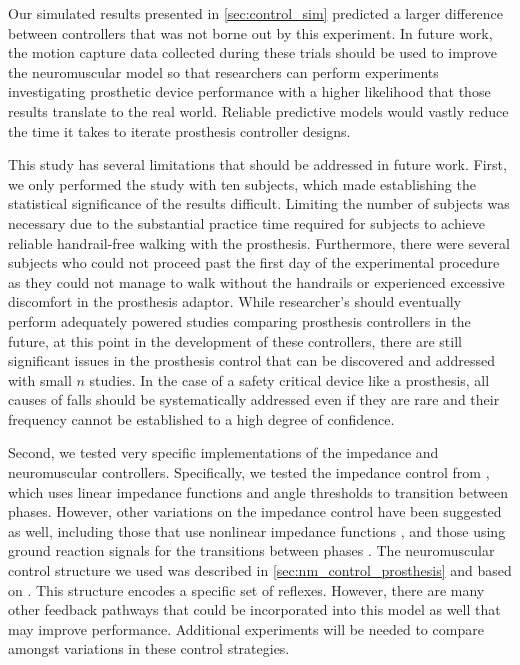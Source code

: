 Our simulated results presented in \cref{sec:control_sim} predicted a larger
difference between controllers that was not borne out by this experiment.  In
future work, the motion capture data collected during these trials should be
used to improve the neuromuscular model so that researchers can perform
experiments investigating prosthetic device performance with a higher likelihood
that those results translate to the real world. Reliable predictive models would
vastly reduce the time it takes to iterate prosthesis controller designs.

This study has several limitations that should be addressed in future work.
First, we only performed the study with ten subjects, which made establishing
the statistical significance of the results difficult. Limiting the number of
subjects was necessary due to the substantial practice time required for
subjects to achieve reliable handrail-free walking with the prosthesis.
Furthermore, there were several  subjects who could not proceed
past the first day of the experimental procedure as they could not manage to
walk without the handrails or experienced excessive discomfort in the prosthesis
adaptor. While researcher's should eventually perform adequately powered studies
comparing prosthesis controllers in the future, at this point in the development
of these controllers, there are still significant issues in the prosthesis
control that can be discovered and addressed with small $n$ studies. In the case
of a safety critical device like a prosthesis, all causes of falls should be
systematically addressed even if they are rare and their frequency cannot be
established to a high degree of confidence.

Second, we tested very specific implementations of the impedance and
neuromuscular controllers. Specifically, we tested the impedance control from
\citet{lawson2014robotic}, which uses linear impedance functions and angle
thresholds to transition between phases. However, other variations on the
impedance control have been suggested as well, including those that use
nonlinear impedance functions \citep{sup2007design,shultz2016variable}, and
those using ground reaction signals for the transitions between phases
\citep{sup2009preliminary}. The neuromuscular control structure we used was
described in \cref{sec:nm_control_prosthesis} and based on
\citet{song2015neural}. This structure encodes a specific set of reflexes.
However, there are many other feedback pathways that could be incorporated into
this model as well that may improve performance. Additional experiments will be
needed to compare amongst variations in these control strategies.


